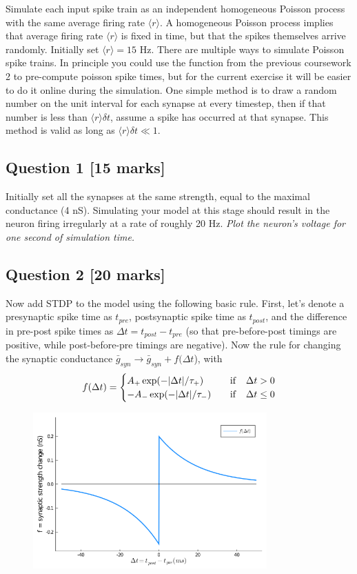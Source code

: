 \documentclass[12pt]{article}
\begin{document}
Simulate each input spike train as an independent homogeneous Poisson
process with the same average firing rate $\langle r\rangle$. A homogeneous
Poisson process implies that average firing rate $\langle r\rangle$
is fixed in time, but that the spikes themselves arrive randomly.
Initially set $\langle r\rangle=15$ Hz. There are multiple ways to
simulate Poisson spike trains. In principle you could use the function from the previous coursework 2 to pre-compute poisson spike times, but for the current exercise it will be easier to do it online during the simulation. One simple method is
to draw a random number on the unit interval for each synapse at every
timestep, then if that number is less than $\langle r\rangle\delta t$,
assume a spike has occurred at that synapse. This method is valid as
long as $\langle r\rangle\delta t\ll1$.

\subsection*{Question 1 [15 marks]}
Initially set all the synapses at the same strength, equal to the maximal conductance (4 nS). Simulating your model at this stage should result in the neuron firing irregularly at a rate of roughly 20 Hz. \emph{Plot the neuron's voltage for one second of simulation time.}


\subsection*{Question 2 [20 marks]}
Now add STDP to the model using the following basic rule. First, let's denote
a presynaptic spike time as $t_{pre}$, postsynaptic spike time as
$t_{post}$, and the difference in pre-post spike times as $\Delta t=t_{post}-t_{pre}$
(so that pre-before-post timings are positive, while post-before-pre
timings are negative). Now the rule for changing the synaptic conductance
$\bar{g}_{syn}\rightarrow\bar{g}_{syn}+f(\Delta t$), with 
\[
f(\Delta t)=
\begin{cases} A_{+}\exp(-|\Delta t|/\tau_{+})  \quad  &{\rm if} \quad \Delta t>0 \cr
-A_{-}\exp(-|\Delta t|/\tau_{-}) \quad  &{\rm if}\quad \Delta t\leq0 \cr
\end{cases}
\]

\begin{figure}[h!]
\includegraphics[width=0.8\textwidth]{stdp.png}
\end{figure}
\end{document}
